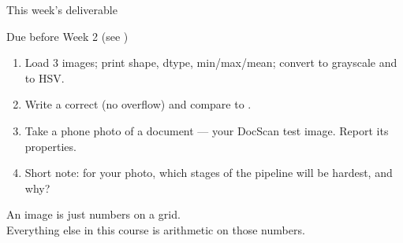 \documentclass[10pt,aspectratio=169]{beamer}
\begin{document}
\begin{frame}{This week's deliverable}
  \begin{alertblock}{Due before Week 2 (see )}
    \begin{enumerate}
      \item Load 3 images; print shape, dtype, min/max/mean; convert to grayscale and to HSV.
      \item Write a correct  (no overflow) and compare to .
      \item Take a phone photo of a document — your DocScan test image. Report its properties.
      \item Short note: for your photo, which stages of the pipeline will be hardest, and why?
    \end{enumerate}
  \end{alertblock}
\end{frame}

\begin{frame}[standout]
  An image is just numbers on a grid.\\[4pt]
  \normalsize Everything else in this course is arithmetic on those numbers.
\end{frame}
\end{document}

